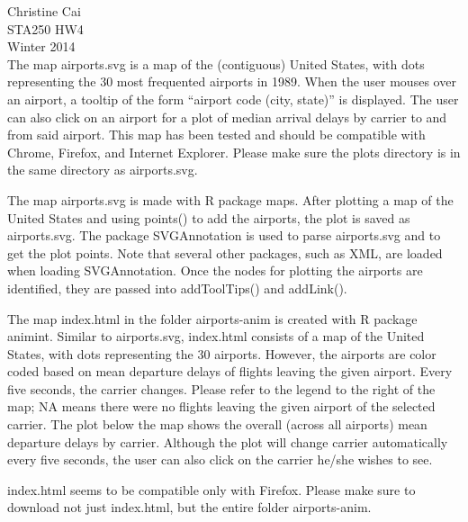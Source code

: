\documentclass[12pt]{article}
\begin{document}
\noindent Christine Cai\\
STA250 HW4\\
Winter 2014\\

The map airports.svg is a map of the (contiguous) United States, with dots representing the 30 most frequented airports in 1989. When the user mouses over an airport, a tooltip of the form ``airport code (city, state)'' is displayed. The user can also click on an airport for a plot of median arrival delays by carrier to and from said airport. This map has been tested and should be compatible with Chrome, Firefox, and Internet Explorer. Please make sure the plots directory is in the same directory as airports.svg.

The map airports.svg is made with R package maps. After plotting a map of the United States and using points() to add the airports, the plot is saved as airports.svg. The package SVGAnnotation is used to parse airports.svg and to get the plot points. Note that several other packages, such as XML, are loaded when loading SVGAnnotation. Once the nodes for plotting the airports are identified, they are passed into addToolTips() and addLink().

The map index.html in the folder airports-anim is created with R package animint. Similar to airports.svg, index.html consists of a map of the United States, with dots representing the 30 airports. However, the airports are color coded based on mean departure delays of flights leaving the given airport. Every five seconds, the carrier changes. Please refer to the legend to the right of the map; NA means there were no flights leaving the given airport of the selected carrier. The plot below the map shows the overall (across all airports) mean departure delays by carrier. Although the plot will change carrier automatically every five seconds, the user can also click on the carrier he/she wishes to see.

index.html seems to be compatible only with Firefox. Please make sure to download not just index.html, but the entire folder airports-anim.
\end{document}
